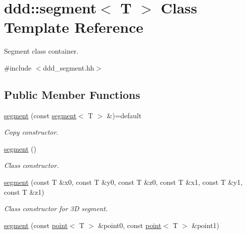 \hypertarget{classddd_1_1segment}{}\section{ddd\+:\+:segment$<$ T $>$ Class Template Reference}
\label{classddd_1_1segment}


Segment class container.  




{\ttfamily \#include $<$ddd\+\_\+segment.\+hh$>$}

\subsection*{Public Member Functions}
\begin{DoxyCompactItemize}
\item 
\mbox{\label{classddd_1_1segment_ad6ed63172c53846edce9a982ea54f734}} 
\hyperlink{classddd_1_1segment_ad6ed63172c53846edce9a982ea54f734}{segment} (const \hyperlink{classddd_1_1segment}{segment}$<$ T $>$ \&)=default
\begin{DoxyCompactList}\small\item\em Copy constructor. \end{DoxyCompactList}\item 
\mbox{\label{classddd_1_1segment_a11949f0ad3906498f0625230b5a04fa7}} 
\hyperlink{classddd_1_1segment_a11949f0ad3906498f0625230b5a04fa7}{segment} ()
\begin{DoxyCompactList}\small\item\em Class constructor. \end{DoxyCompactList}\item 
\mbox{\label{classddd_1_1segment_a4a0a5e0d31877978f3f3652fa3097162}} 
\hyperlink{classddd_1_1segment_a4a0a5e0d31877978f3f3652fa3097162}{segment} (const T \&x0, const T \&y0, const T \&z0, const T \&x1, const T \&y1, const T \&z1)
\begin{DoxyCompactList}\small\item\em Class constructor for 3D segment. \end{DoxyCompactList}\item 
\hyperlink{classddd_1_1segment_afdfcc983efc30b3dee0af2603795775b}{segment} (const \hyperlink{classddd_1_1point}{point}$<$ T $>$ \&point0, const \hyperlink{classddd_1_1point}{point}$<$ T $>$ \&point1)

\end{DoxyCompactItemize}
